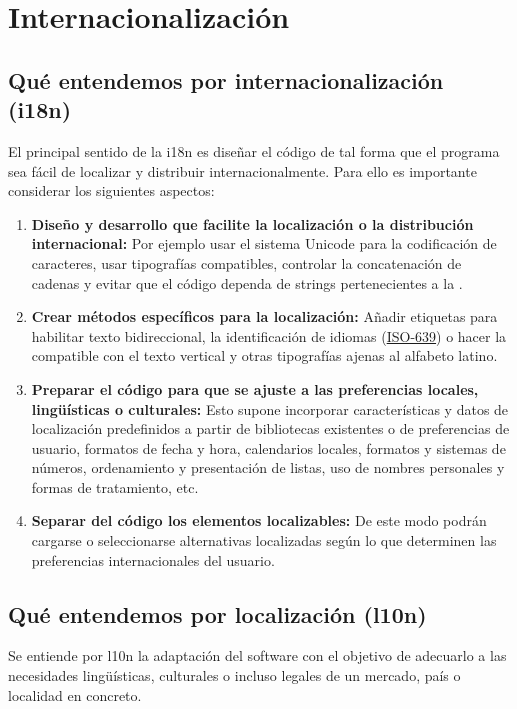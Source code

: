 
\section{Internacionalización}\label{i18n:internacionalizacion}

\subsection{Qué entendemos por internacionalización (i18n)}\label{i18n:que-entendemos-i18n}

El principal sentido de la i18n es diseñar el código de tal forma que el programa sea fácil de localizar y distribuir internacionalmente. Para ello es importante considerar los siguientes aspectos:

\begin{enumerate}
	\item \textbf{Diseño y desarrollo que facilite la localización o la distribución internacional:}
	Por ejemplo usar el sistema Unicode para la codificación de caracteres, usar tipografías compatibles, controlar la concatenación de cadenas y evitar que el código dependa de strings pertenecientes a la .
	
	\item \textbf{Crear métodos específicos para la localización:}
	Añadir etiquetas para habilitar texto bidireccional, la identificación de idiomas (\href{https://es.wikipedia.org/wiki/ISO_639}{ISO-639}) o hacer la  compatible con el texto vertical y otras tipografías ajenas al alfabeto latino.
	
	\item \textbf{Preparar el código para que se ajuste a las preferencias locales, lingüísticas o culturales:}
	Esto supone incorporar características y datos de localización predefinidos a partir de bibliotecas existentes o de preferencias de usuario, formatos de fecha y hora, calendarios locales, formatos y sistemas de números, ordenamiento y presentación de listas, uso de nombres personales y formas de tratamiento, etc.
	
	\item \textbf{Separar del código los elementos localizables:}
	De este modo podrán cargarse o seleccionarse alternativas localizadas según lo que determinen las preferencias internacionales del usuario.
\end{enumerate}

\subsection{Qué entendemos por localización (l10n)}\label{i18n:que-entendemos-l10n}
Se entiende por l10n la adaptación del software con el objetivo de adecuarlo a las necesidades lingüísticas, culturales o incluso legales de un mercado, país o localidad en concreto.

